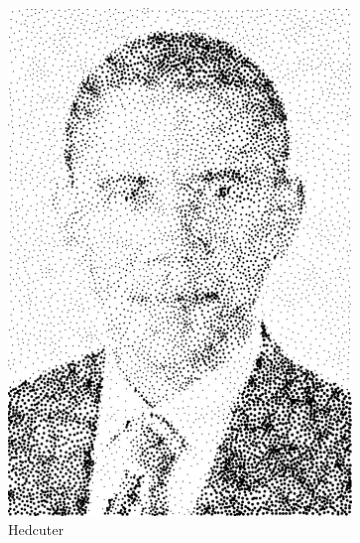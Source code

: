 \documentclass[11pt]{article}
\begin{document}
\begin{enumerate}
\begin{figure}[H]
\begin{subfigure}{0.4\textwidth}
        \includegraphics[width=\textwidth]{../results/hedcuter/5-1.pdf}
 \caption{Hedcuter}
    \end{subfigure}
    \begin{subfigure}{0.4\textwidth}
        \centering

\end{subfigure}
\end{figure}
\end{enumerate}
\end{document}
